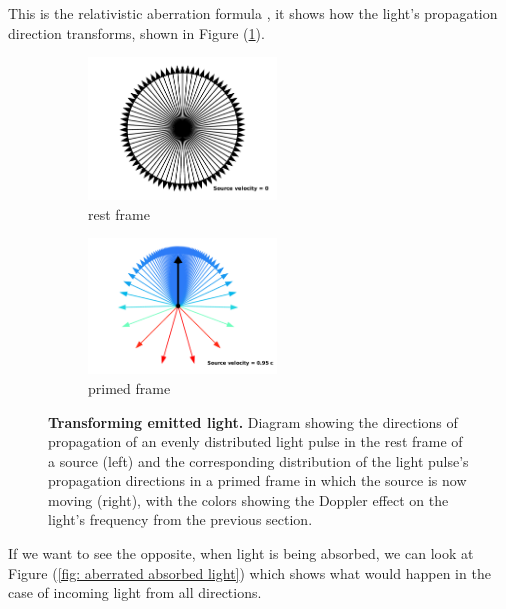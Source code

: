 This is the relativistic aberration formula \cite{einstein1905electrodynamics}, it shows how the light's propagation direction transforms, shown in Figure (\ref{fig: aberrated emitted light}).

\begin{figure}[H]
	\begin{subfigure}{.49\textwidth}
		\centering
		\includegraphics[width = 5cm]{images/pdf/Aberrated_velocities_restframe.pdf}
		\caption{rest frame}
	\end{subfigure}
	\begin{subfigure}{.49\textwidth}
		\centering
		\includegraphics[width = 5cm]{images/pdf/Aberrated_velocities.pdf}
		\caption{primed frame}
	\end{subfigure}
	\caption{\textbf{Transforming emitted light.} Diagram showing the directions of propagation of an evenly distributed light pulse in the rest frame of a source (left) and the corresponding distribution of the light pulse's propagation directions in a primed frame in which the source is now moving (right), with the colors showing the Doppler effect on the light's frequency from the previous section.}
	\label{fig: aberrated emitted light}
\end{figure}

If we want to see the opposite, when light is being absorbed, we can look at Figure (\ref{fig: aberrated absorbed light}) which shows what would happen in the case of incoming light from all directions.

